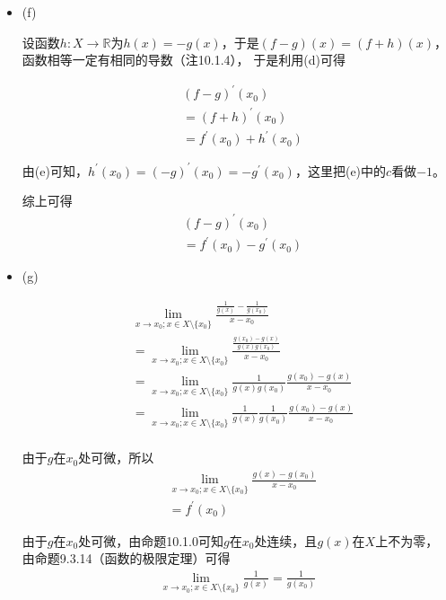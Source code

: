 \documentclass{article}
\begin{document}
\begin{itemize}
  \item (f)

        设函数$h : X \to \mathbb{R}$为$h(x) = -g(x)$，于是$(f-g)(x) = (f+h)(x)$，函数相等一定有相同的导数（注10.1.4），
        于是利用(d)可得

        \begin{align*}
           & (f-g)^\prime(x_0)               \\
           & = (f+h)^\prime(x_0)             \\
           & = f^\prime(x_0) + h^\prime(x_0)
        \end{align*}

        由(e)可知，$h^\prime(x_0) = (-g)^\prime(x_0) = -g^\prime(x_0)$，这里把(e)中的$c$看做$-1$。

        综上可得
        \begin{align*}
           & (f-g)^\prime(x_0)               \\
           & = f^\prime(x_0) - g^\prime(x_0)
        \end{align*}


  \item (g)

        \begin{align*}
           & \lim\limits_{x \to x_0; x \in X \setminus \{x_0\}} \frac{\frac{1}{g(x)} - \frac{1}{g(x_0)}}{x - x_0}               \\
           & = \lim\limits_{x \to x_0; x \in X \setminus \{x_0\}} \frac{\frac{g(x_0) - g(x)}{g(x)g(x_0)}}{x - x_0}              \\
           & = \lim\limits_{x \to x_0; x \in X \setminus \{x_0\}} \frac{1}{g(x)g(x_0)} \frac{g(x_0) - g(x)}{x - x_0}            \\
           & = \lim\limits_{x \to x_0; x \in X \setminus \{x_0\}} \frac{1}{g(x)} \frac{1}{g(x_0)} \frac{g(x_0) - g(x)}{x - x_0} \\
        \end{align*}

        由于$g$在$x_0$处可微，所以
        \begin{align*}
           & \lim\limits_{x \to x_0; x \in X \setminus \{x_0\}} \frac{g(x) - g(x_0)}{x - x_0} \\
           & = f^\prime(x_0)
        \end{align*}

        由于$g$在$x_0$处可微，由命题10.1.0可知$g$在$x_0$处连续，且$g(x)$在$X$上不为零，
        由命题9.3.14（函数的极限定理）可得
        \begin{align*}
          \lim\limits_{x \to x_0; x \in X \setminus \{x_0\}} \frac{1}{g(x)} = \frac{1}{g(x_0)}
        \end{align*}



\end{itemize}
\end{document}
